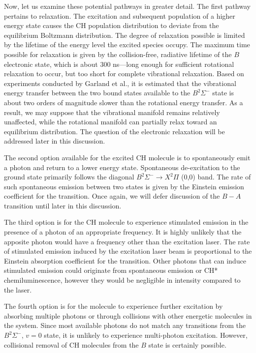 Now, let us examine these potential pathways in greater detail.
The first pathway pertains to relaxation.
The excitation and subsequent population of a higher energy state causes the CH population distribution to deviate from the equilibrium Boltzmann distribution.
The degree of relaxation possible is limited by the lifetime of the energy level the excited species occupy. 
The maximum time possible for relaxation is given by the collision-free, radiative lifetime of the \(B\) electronic state, which is about 300 ns\cite{1996-luque-c}---long enough for sufficient rotational relaxation to occur, but too short for complete vibrational relaxation.
Based on experiments conducted by Garland et al.\cite{1985-garland-b}, it is estimated that the vibrational energy transfer between the two bound states available to the \(B^2\Sigma^-\) state is about two orders of magnitude slower than the rotational energy transfer.
As a result, we may suppose that the vibrational manifold remains relatively unaffected, while the rotational manifold can partially relax toward an equilibrium distribution.
The question of the electronic relaxation will be addressed later in this discussion.

The second option available for the excited CH molecule is to spontaneously emit a photon and return to a lower energy state.
Spontaneous de-excitation to the ground state primarily follows the diagonal \(B^2\Sigma^-\rightarrow X^2\Pi\) (0,0) band.
The rate of such spontaneous emission between two states is given by the Einstein emission coefficient for the transition.
Once again, we will defer discussion of the \(B-A\) transition until later in this discussion.

The third option is for the CH molecule to experience stimulated emission in the presence of a photon of an appropriate frequency.
It is highly unlikely that the apposite photon would have a frequency other than the excitation laser.
The rate of stimulated emission induced by the excitation laser beam is proportional to the Einstein absorption coefficient for the transition.
Other photons that can induce stimulated emission could originate from spontaneous emission or CH* chemiluminescence, however they would be negligible in intensity compared to the laser.

The fourth option is for the molecule to experience further excitation by absorbing multiple photons or through collisions with other energetic molecules in the system.
Since most available photons do not match any transitions from the \(B^2\Sigma^-\), \(v=0\) state, it is unlikely to experience multi-photon excitation.
However, collisional removal of CH molecules from the \(B\) state is certainly possible.

